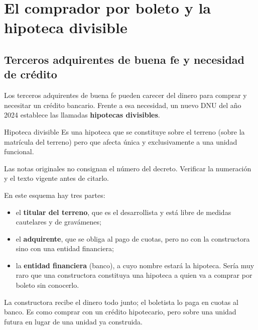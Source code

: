\documentclass[12pt,oneside]{book}
\begin{document}
\chapter[La hipoteca divisible]{El comprador por boleto y la hipoteca divisible}\label{cap:hipoteca-divisible}

\section{Terceros adquirentes de buena fe y necesidad de crédito}

Los terceros adquirentes de buena fe pueden carecer del dinero para comprar y necesitar un crédito bancario. Frente a esa necesidad, un nuevo DNU del año 2024 establece las llamadas \textbf{hipotecas divisibles}.

\begin{definition}{Hipoteca divisible}
Es una hipoteca que se constituye sobre el terreno (sobre la matrícula del terreno) pero que afecta única y exclusivamente a una unidad funcional.
\end{definition}

\begin{note}
Las notas originales no consignan el número del decreto. Verificar la numeración y el texto vigente antes de citarlo.
\end{note}

En este esquema hay tres partes:

\begin{itemize}
    \item el \textbf{titular del terreno}, que es el desarrollista y está libre de medidas cautelares y de gravámenes;
    \item el \textbf{adquirente}, que se obliga al pago de cuotas, pero no con la constructora sino con una entidad financiera;
    \item la \textbf{entidad financiera} (banco), a cuyo nombre estará la hipoteca. Sería muy raro que una constructora constituya una hipoteca a quien va a comprar por boleto sin conocerlo.
\end{itemize}

La constructora recibe el dinero todo junto; el boletista lo paga en cuotas al banco. Es como comprar con un crédito hipotecario, pero sobre una unidad futura en lugar de una unidad ya construida.
\end{document}
